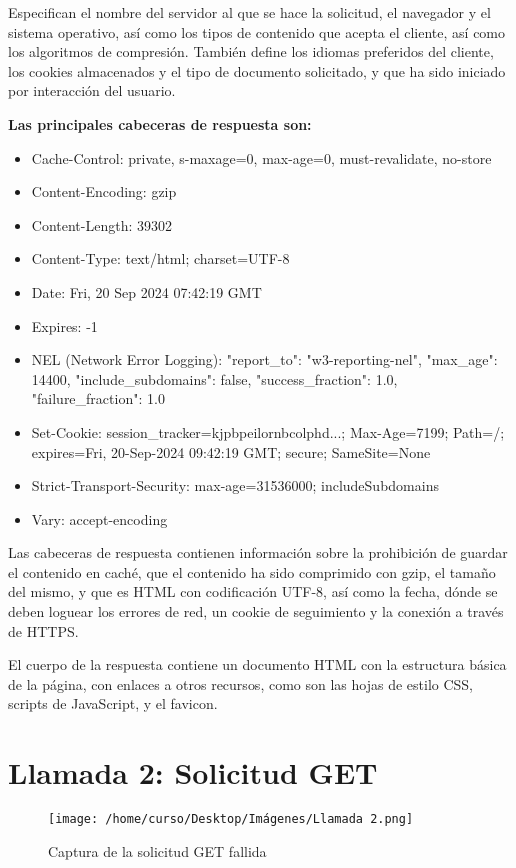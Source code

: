 \documentclass[a4paper,12pt]{article}
\begin{document}
Especifican el nombre del servidor al que se hace la solicitud, el navegador y el sistema operativo, así como los tipos de contenido que acepta el cliente, así como los algoritmos de compresión. También define los idiomas preferidos del cliente, los cookies almacenados y el tipo de documento solicitado, y que ha sido iniciado por interacción del usuario.

\textbf{Las principales cabeceras de respuesta son:}
\begin{itemize}
    \item Cache-Control: private, s-maxage=0, max-age=0, must-revalidate, no-store
    \item Content-Encoding: gzip
    \item Content-Length: 39302
    \item Content-Type: text/html; charset=UTF-8
    \item Date: Fri, 20 Sep 2024 07:42:19 GMT
    \item Expires: -1
    \item NEL (Network Error Logging): {"report\_to": "w3-reporting-nel", "max\_age": 14400, "include\_subdomains": false, "success\_fraction": 1.0, "failure\_fraction": 1.0}
    \item Set-Cookie: session\_tracker=kjpbpeilornbcolphd...; Max-Age=7199; Path=/; expires=Fri, 20-Sep-2024 09:42:19 GMT; secure; SameSite=None
    \item Strict-Transport-Security: max-age=31536000; includeSubdomains
    \item Vary: accept-encoding
\end{itemize}

Las cabeceras de respuesta contienen información sobre la prohibición de guardar el contenido en caché, que el contenido ha sido comprimido con gzip, el tamaño del mismo, y que es HTML con codificación UTF-8, así como la fecha, dónde se deben loguear los errores de red, un cookie de seguimiento y la conexión a través de HTTPS.

El cuerpo de la respuesta contiene un documento HTML con la estructura básica de la página, con enlaces a otros recursos, como son las hojas de estilo CSS, scripts de JavaScript, y el favicon. 

\section*{Llamada 2: Solicitud GET}

\begin{figure}[h!]
    \centering
    \texttt{[image: /home/curso/Desktop/Imágenes/Llamada 2.png]}
    \caption{Captura de la solicitud GET fallida}
\end{figure}
\end{document}
